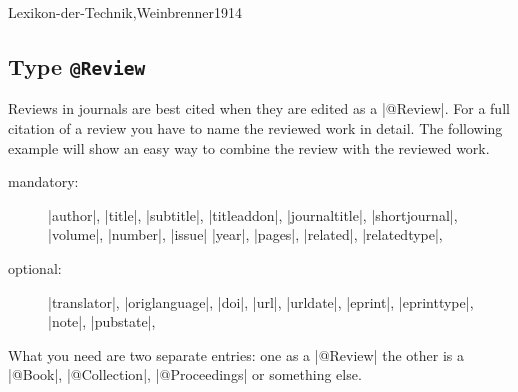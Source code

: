 \documentclass[a4paper,
10pt,
greek,
french,
spanish,
italian,
ngerman,
english
]{ltxdoc}
\begin{document}
\begin{refsection}
\begin{bibbsp}{Lexikon-der-Technik,Weinbrenner1914}
\nocite{Lexikon-der-Technik,Weinbrenner1914}
 \printbibliography[keyword=corpus,title={Corpora}]
\printbibliography[notkeyword=corpus]
\end{bibbsp}
 \end{refsection}


 
 \subsection{Type \texttt{@Review}}\label{review}
Reviews in journals are best cited when they are edited as a |@Review|.
For a full citation of a review you have to name the reviewed work in detail.
The following example will show an easy way to combine the review with the reviewed work.

\begin{description}
\item[mandatory:] 
|author|, |title|, |subtitle|, |titleaddon|,
|journaltitle|, |shortjournal|, |volume|, |number|, |issue|
|year|, |pages|, 
|related|, |relatedtype|,
\item[optional:]
|translator|, |origlanguage|,
|doi|, |url|, |urldate|, |eprint|, |eprinttype|, |note|, |pubstate|, 
 \end{description}

What you need are two separate entries: one as a |@Review| the other is a |@Book|, |@Collection|, |@Proceedings| or something else.
\end{document}
